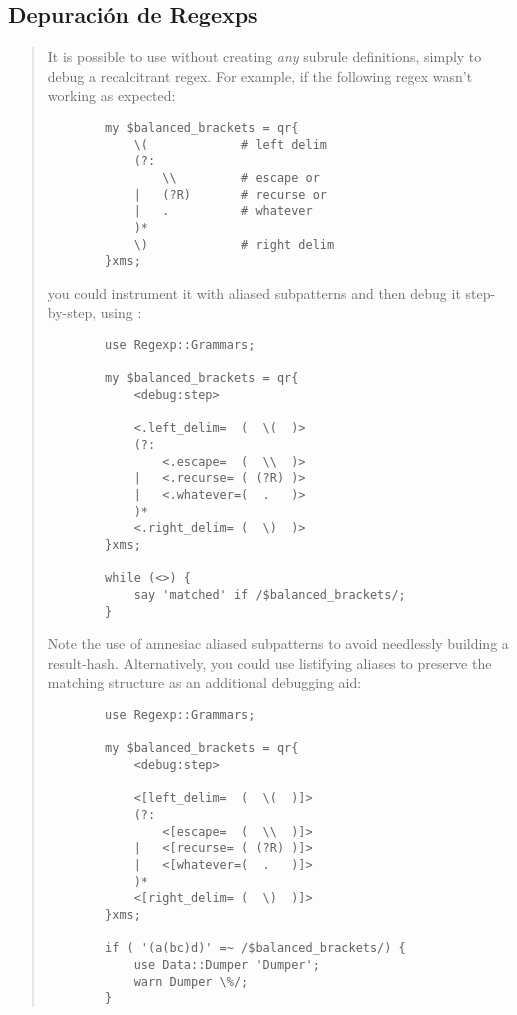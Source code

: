 \subsection{Depuración de Regexps}

\begin{it}\begin{quotation}
    It is possible to use  without creating \emph{any} subrule
    definitions, simply to debug a recalcitrant regex. For example, if the
    following regex wasn't working as expected:

\begin{verbatim}
        my $balanced_brackets = qr{
            \(             # left delim
            (?:
                \\         # escape or
            |   (?R)       # recurse or
            |   .          # whatever
            )*
            \)             # right delim
        }xms;
\end{verbatim}

    you could instrument it with aliased subpatterns and then debug it
    step-by-step, using :

\begin{verbatim}
        use Regexp::Grammars;

        my $balanced_brackets = qr{
            <debug:step>

            <.left_delim=  (  \(  )>
            (?:
                <.escape=  (  \\  )>
            |   <.recurse= ( (?R) )>
            |   <.whatever=(  .   )>
            )*
            <.right_delim= (  \)  )>
        }xms;

        while (<>) {
            say 'matched' if /$balanced_brackets/;
        }
\end{verbatim}

    Note the use of amnesiac aliased subpatterns to avoid needlessly
    building a result-hash. Alternatively, you could use listifying aliases
    to preserve the matching structure as an additional debugging aid:

\begin{verbatim}
        use Regexp::Grammars;

        my $balanced_brackets = qr{
            <debug:step>

            <[left_delim=  (  \(  )]>
            (?:
                <[escape=  (  \\  )]>
            |   <[recurse= ( (?R) )]>
            |   <[whatever=(  .   )]>
            )*
            <[right_delim= (  \)  )]>
        }xms;

        if ( '(a(bc)d)' =~ /$balanced_brackets/) {
            use Data::Dumper 'Dumper';
            warn Dumper \%/;
        }
\end{verbatim}
\end{quotation}\end{it}


